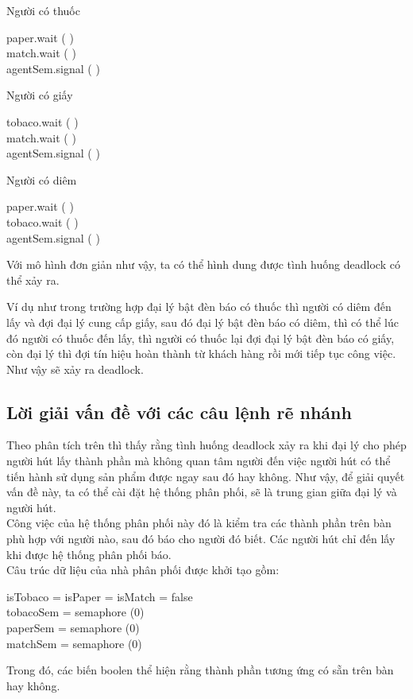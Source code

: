\documentclass[a4paper]{article}
\begin{document}
	\begin{center}
		Người có thuốc
		\begin{tcolorbox}
		paper.wait ( ) \\
		match.wait ( ) \\ 
		agentSem.signal ( ) 
		\end{tcolorbox}
	\end{center}
	\begin{center}
		Người có giấy
		\begin{tcolorbox}
		tobaco.wait ( ) \\
		match.wait ( ) \\ 
		agentSem.signal ( ) 
		\end{tcolorbox}
	\end{center}
	\begin{center}
		Người có diêm
		\begin{tcolorbox}
		paper.wait ( ) \\
		tobaco.wait ( ) \\ 
		agentSem.signal ( ) 
		\end{tcolorbox}
	\end{center}
	
	
	Với mô hình đơn giản như vậy, ta có thể hình dung được tình huống deadlock có thể xảy ra. 
	
	
	Ví dụ như trong trường hợp đại lý bật đèn báo có thuốc thì người có diêm đến lấy và đợi đại lý 
	cung cấp giấy, sau đó đại lý bật đèn báo có diêm, thì có thể lúc đó người có thuốc đến lấy,
	thì người có thuốc lại đợi đại lý bật đèn báo có giấy, còn đại lý thì đợi tín hiệu hoàn thành từ 
	khách hàng rồi mới tiếp tục công việc. Như vậy sẽ xảy ra deadlock.
	\subsection{Lời giải vấn đề với các câu lệnh rẽ nhánh}
	Theo phân tích trên thì thấy rằng tình huống deadlock xảy ra khi đại lý cho phép người hút
	lấy thành phần mà không quan tâm người đến việc người hút có thể tiến hành sử dụng sản phẩm được ngay sau 
	đó hay không. Như vậy, để giải quyết vấn đề này, 
	ta có thể cài đặt hệ thống phân phối, sẽ là trung gian giữa đại lý và người hút. \\
	Công việc của hệ thống phân phối này đó là kiểm tra các thành phần trên bàn phù hợp với người 
	nào, sau đó báo cho người đó biết. Các người hút chỉ đến lấy khi được hệ thống phân phối báo. \\
	Câu trúc dữ liệu của nhà phân phối được khởi tạo gồm: 
	\begin{tcolorbox}
	isTobaco = isPaper = isMatch = false \\
	tobacoSem = semaphore (0) \\
	paperSem = semaphore (0) \\
	matchSem = semaphore (0)
	\end{tcolorbox}
	Trong đó, các biến boolen thể hiện rằng thành phần tương ứng có sẵn trên bàn hay không. 
	
\end{document}
